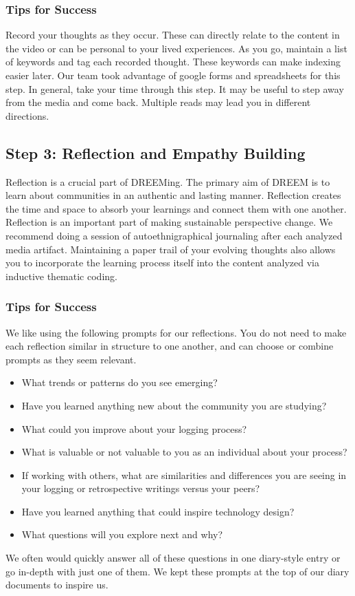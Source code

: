 \subsubsection{Tips for Success}
Record your thoughts as they occur. These can directly relate to the content in the video or can be personal to your lived experiences. As you go, maintain a list of keywords and tag each recorded thought. These keywords can make indexing easier later. Our team took advantage of google forms and spreadsheets for this step. In general, take your time through this step. It may be useful to step away from the media and come back. Multiple reads may lead you in different directions. 

\subsection{Step 3: Reflection and Empathy Building}
Reflection is a crucial part of DREEMing. The primary aim of DREEM is to learn about communities in an authentic and lasting manner. Reflection creates the time and space to absorb your learnings and connect them with one another. Reflection is an important part of making sustainable perspective change. \cite{lyubomirskyPursuingHappinessArchitecture2005} We recommend doing a session of autoethnigraphical journaling after each analyzed media artifact. 
Maintaining a paper trail of your evolving thoughts also allows you to incorporate the learning process itself into the content analyzed via inductive thematic coding. 

\subsubsection{Tips for Success}
We like using the following prompts for our reflections. You do not need to make each reflection similar in structure to one another, and can choose or combine prompts as they seem relevant. 
\begin{itemize}
\item What trends or patterns do you see emerging?
\item Have you learned anything new about the community you are studying?
\item What could you improve about your logging process?
\item What is valuable or not valuable to you as an individual about your process? 
\item If working with others, what are similarities and differences you are seeing in your logging or retrospective writings versus your peers?
\item Have you learned anything that could inspire technology design?
\item What questions will you explore next and why? 
\end{itemize}
We often would quickly answer all of these questions in one diary-style entry or go in-depth with just one of them. We kept these prompts at the top of our diary documents to inspire us.

